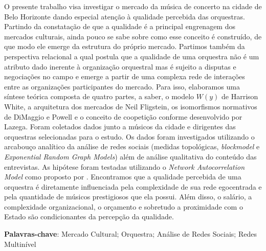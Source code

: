 \documentclass[a4paper, 12pt, openright, oneside, german, french, english, brazil]{abntex2}
\begin{document}
	\begin{resumo}
		O presente trabalho visa investigar o mercado da música de concerto na cidade de Belo Horizonte dando especial atenção à qualidade percebida das orquestras. Partindo da constatação de que a qualidade é a principal engrenagem dos mercados culturais, ainda pouco se sabe sobre como esse conceito é construído, de que modo ele emerge da estrutura do próprio mercado. Partimos também da perspectiva relacional a qual postula que a qualidade de uma orquestra não é um atributo dado inerente à organização orquestral mas é sujeito a disputas e negociações no campo e emerge a partir de uma complexa rede de interações entre as organizações participantes do mercado. Para isso, elaboramos uma síntese teórica composta de quatro partes, a saber, o modelo $W(y)$ de Harrison White, a arquitetura dos mercados de Neil Fligstein, os isomorfismos normativos de DiMaggio e Powell e o conceito de coopetição conforme desenvolvido por Lazega. Foram coletados dados junto a músicos da cidade e dirigentes das orquestras selecionadas para o estudo. Os dados foram investigados utilizando o arcabouço analítico da análise de redes sociais (medidas topológicas, \textit{blockmodel} e \textit{Exponential Random Graph Models}) além de análise qualitativa do conteúdo das entrevistas. As hipótese foram testadas utilizando o \textit{Network Autocorrelation Model} como proposto por . Encontramos que a qualidade percebida de uma orquestra é diretamente influenciada pela complexidade de sua rede egocentrada e pela quantidade de músicos prestigiosos que ela possui. Além disso, o salário, a complexidade organizacional, o orçamento e sobretudo a proximidade com o Estado são condicionantes da percepção da qualidade.
		
		
		\vspace{\onelineskip}
		\noindent
		\textbf{Palavras-chave}: Mercado Cultural; Orquestra; Análise de Redes Sociais; Redes Multinível
              \end{resumo}
              
\end{document}
